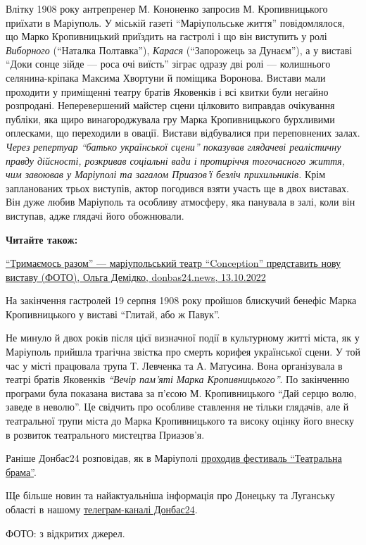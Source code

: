 Влітку 1908 року антрепренер М. Кононенко запросив М. Кропивницького приїхати в
Маріуполь. У міській газеті \enquote{Маріупольське життя} повідомлялося, що Марко
Кропивницький приїздить на гастролі і що він виступить у ролі \emph{Виборного}
(\enquote{Наталка Полтавка}), \emph{Карася} (\enquote{Запорожець за Дунаєм}), а у виставі \enquote{Доки сонце
зійде — роса очі виїсть} зіграє одразу дві ролі — колишнього селянина-кріпака
Максима Хвортуни й поміщика Воронова. Вистави мали проходити у приміщенні
театру братів Яковенків і всі квитки були негайно розпродані. Неперевершений
майстер сцени цілковито виправдав очікування публіки, яка щиро винагороджувала
гру Марка Кропивницького бурхливими оплесками, що переходили в овації. Вистави
відбувалися при переповнених залах. \emph{Через репертуар \enquote{батько української сцени}
показував глядачеві реалістичну правду дійсності, розкривав соціальні вади і
протиріччя тогочасного життя, чим завоював у Маріуполі та загалом Приазов'ї
безліч прихильників.} Крім запланованих трьох виступів, актор погодився взяти
участь ще в двох виставах. Він дуже любив Маріуполь та особливу атмосферу, яка
панувала в залі, коли він виступав, адже глядачі його обожнювали.

\textbf{Читайте також:} 

\href{https://donbas24.news/news/trimajemos-razom-mariupolskii-teatr-conception-predstavit-novu-vistavu-foto}{%
\enquote{Тримаємось разом} — маріупольський театр \enquote{Conception} представить нову виставу (ФОТО), Ольга Демідко, donbas24.news, 13.10.2022}


На закінчення гастролей 19 серпня 1908 року пройшов блискучий бенефіс Марка
Кропивницького у виставі \enquote{Глитай, або ж Павук}.

Не минуло й двох років після цієї визначної події в культурному житті міста, як
у Маріуполь прийшла трагічна звістка про смерть корифея української сцени. У
той час у місті працювала трупа Т. Левченка та А. Матусина. Вона організувала в
театрі братів Яковенків \emph{\enquote{Вечір пам'яті Марка Кропивницького}}. По закінченню
програми була показана вистава за п'єсою М. Кропивницького \enquote{Дай серцю волю,
заведе в неволю}. Це свідчить про особливе ставлення не тільки глядачів, але й
театральної трупи міста до Марка Кропивницького та високу оцінку його внеску в
розвиток театрального мистецтва Приазов’я.

Раніше Донбас24 розповідав, як в Маріуполі
\href{https://donbas24.news/news/yak-v-mariupoli-proxodiv-festival-teatralna-brama-detali}{проходив
фестиваль \enquote{Театральна брама}}.

Ще більше новин та найактуальніша інформація про Донецьку та Луганську області
в нашому \href{https://t.me/donbas24}{телеграм-каналі Донбас24}.

ФОТО: з відкритих джерел.


